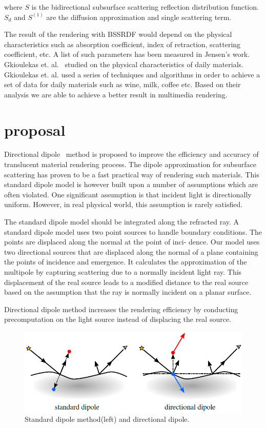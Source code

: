 \documentclass[12pt]{article}
\begin{document}
where $S$ is the bidirectional subsurface scattering reflection distribution
function. $S_d$ and $S^{(1)}$ are the diffusion approximation and
single scattering term.

The result of the rendering with BSSRDF would depend on the physical
characteristics such as absorption coefficient, index of retraction,
scattering coefficient, etc. A list of such parameters has been
measured in Jensen's work. Gkioulekas et. al.~\cite{materials} studied on the
physical characteristics of daily materials. Gkioulekas et. al. used a
series of techniques and algorithms in order to achieve a set of data
for daily materials such as wine, milk, coffee etc. Based on their
analysis we are able to achieve a better result in multimedia
rendering.

\section{proposal}
Directional dipole~\cite{direction} method is proposed to improve the efficiency and
accuracy of translucent material rendering process.
The dipole approximation for subsurface scattering has proven to be a
fast practical way of rendering such materials. This standard dipole
model is however built upon a number of assumptions which are often
violated. One significant assumption is that incident light is
directionally uniform. However, in real physical world, this
assumption is rarely satisfied.

The standard dipole model should be integrated along the refracted
ray.
A standard dipole model uses two point sources to handle boundary
conditions. The points are displaced along the normal at the point of
inci- dence. Our model uses two directional sources that are displaced
along the normal of a plane containing the points of incidence and
emergence. It calculates the approximation of the multipole by capturing scattering due to a
normally incident light ray. This displacement
of the real source leads to a modified distance to the real source
based on the assumption that the ray is normally incident on a planar surface.

Directional dipole method increases the rendering efficiency by
conducting precomputation on the light source instead of displacing
the real source.

\begin{figure}[!ht]
  \centering
  \includegraphics[scale=0.5]{dipoles.png}
  \caption{Standard dipole method(left) and directional dipole.}
  \label{fig:dipole}
\end{figure}
\end{document}
